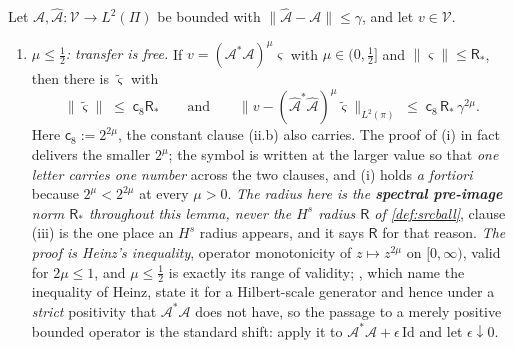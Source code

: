 \begin{lemma}\label{lem:srctransfer}
Let $\mathcal A,\hat{\mathcal A}:\mathcal V\to L^{2}(\Pi)$ be bounded with
$\|\hat{\mathcal A}-\mathcal A\|\le\gamma$, and let $v\in\mathcal V$.
\begin{enumerate}
\item[(i)] \emph{$\mu\le\tfrac12$: transfer is free.} If $v=(\mathcal A^\ast\mathcal A)^{\mu}\varsigma$
with $\mu\in(0,\tfrac12]$ and $\|\varsigma\|\le\mathsf R_\ast$, then there is $\tilde\varsigma$ with
\[
\|\tilde\varsigma\|\;\le\;\mathsf c_8\mathsf R_\ast
\qquad\text{and}\qquad
\big\|v-(\hat{\mathcal A}^\ast\hat{\mathcal A})^{\mu}\tilde\varsigma\big\|_{L^{2}(\pi)}
\;\le\;\mathsf c_8\,\mathsf R_\ast\,\gamma^{2\mu} .
\]
Here $\mathsf c_8:=2^{2\mu}$, the constant clause \textup{(ii.b)} also carries. The proof of
\textup{(i)} in fact delivers the smaller $2^{\mu}$; the symbol is written at the larger value so that
\emph{one letter carries one number} across the two clauses, and \textup{(i)} holds \emph{a fortiori}
because $2^{\mu}<2^{2\mu}$ at every $\mu>0$.
\emph{The radius here is the \textbf{spectral pre-image} norm $\mathsf R_\ast$ throughout this lemma,
never the $H^{s}$ radius $\mathsf R$ of \cref{def:srcball}}, clause (iii) is the one place an
$H^{s}$ radius appears, and it says $\mathsf R$ for that reason.
\emph{The proof is Heinz's inequality}, operator monotonicity of $z\mapsto z^{2\mu}$ on
$[0,\infty)$, valid for $2\mu\le1$, and $\mu\le\tfrac12$ is exactly its range of validity;
\citet[Prop.~8.21]{engl2000}, which \citeauthor{engl2000} name the inequality of Heinz, state it for a
Hilbert-scale generator and hence under a \emph{strict} positivity that $\mathcal A^\ast\mathcal A$
does not have, so the passage to a merely positive bounded operator is the standard shift: apply it to
$\mathcal A^\ast\mathcal A+\epsilon\,\mathrm{Id}$ and let $\epsilon\downarrow0$.

\end{enumerate}
\end{lemma}
